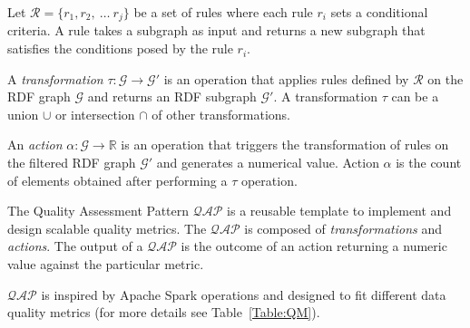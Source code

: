 \begin{definition}[Rule]
Let $\mathcal{R} = \{r_1,r_2,~\dots~r_j\}$ be a set of rules where each rule $r_i$ sets a conditional criteria. A rule takes a subgraph as input and returns a new subgraph that satisfies the conditions posed by the rule $r_i$.
\end{definition}

\begin{definition}[Transformation]
\label{def:tr}
A \textit{transformation} $\tau:\mathcal{G} \rightarrow \mathcal{G'}$ is an operation that applies rules defined by $\mathcal{R}$ on the \gls{RDF} graph $\mathcal{G}$ and returns an \gls{RDF} subgraph $\mathcal{G'}$. 
A transformation $\tau$ can be a union $\cup$ or intersection $\cap$ of other transformations. 
\end{definition}

\begin{definition}[Action]
\label{def:ac}
An \textit{action} $ \alpha: \mathcal{G}\rightarrow \mathbb{R}$ is an operation that triggers the transformation of rules on the filtered \gls{RDF} graph $\mathcal{G'}$ and generates a numerical value. 
Action $\alpha$ is the count of elements obtained after performing a $\tau$ operation.
\end{definition}

\begin{definition}
\label{def:QAP}
The Quality Assessment Pattern $\mathcal{QAP}$ is a reusable template to implement and design scalable quality metrics. %
The $\mathcal{QAP}$ is composed of \textit{transformations} and \textit{actions}. 
The output of a $\mathcal{QAP}$ is the outcome of an action returning a numeric value against the particular metric.
\end{definition}

$\mathcal{QAP}$ is inspired by Apache Spark operations and designed to fit different data quality metrics (for more details see Table~\ref{Table:QM}). 

